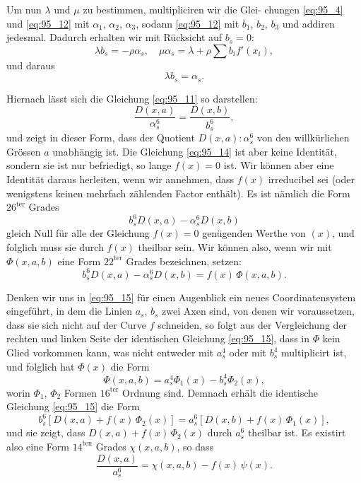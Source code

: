 \documentclass[12pt,a4paper]{article}
\theoremstyle{plain}
\theoremstyle{definition}
\theoremstyle{remark}
\begin{document}
Um nun $\lambda$ und $\mu$ zu bestimmen, multipliciren wir die Glei-
chungen \eqref{eq:95_4} und \eqref{eq:95_12} mit $\alpha_1$, $\alpha_2$, $\alpha_3$, sodann \eqref{eq:95_12} mit $b_1$, $b_2$, $b_3$
und addiren jedesmal. Dadurch erhalten wir mit Rücksicht
auf $b_s = 0$:
\begin{equation*}
\lambda b_s = -\rho \alpha_s, \quad \mu \alpha_s = \lambda + \rho \sum b_i f'(x_i),
\end{equation*}
und daraus
\begin{equation*}
\lambda b_s = \alpha_s.
\end{equation*}

Hiernach lässt sich die Gleichung \eqref{eq:95_11} so darstellen:
\begin{equation}\label{eq:95_14}
\frac{D(x, a)}{\alpha_s^6} = \frac{D(x, b)}{b_s^6},
\end{equation}
und zeigt in dieser Form, dass der Quotient $D(x, a) : \alpha_s^6$ von
den willkürlichen Grössen $a$ unabhängig ist. Die Gleichung \eqref{eq:95_14}
ist aber keine Identität, sondern sie ist nur befriedigt, so lange
$f(x) = 0$ ist. Wir können aber eine Identität daraus herleiten,
wenn wir annehmen, dass $f(x)$ irreducibel sei (oder wenigstens
keinen mehrfach zählenden Factor enthält). Es ist nämlich die
Form $26^{\text{ter}}$ Grades
\begin{equation*}
b_s^6 D(x, a) - \alpha_s^6 D(x, b)
\end{equation*}
gleich Null für alle der Gleichung $f(x) = 0$ genügenden Werthe
von $(x)$, und folglich muss sie durch $f(x)$ theilbar sein. Wir
können also, wenn wir mit $\Phi(x, a, b)$ eine Form $22^{\text{ter}}$ Grades
bezeichnen, setzen:
\begin{equation}\label{eq:95_15}
b_s^6 D(x, a) - \alpha_s^6 D(x, b) = f(x)\, \Phi(x, a, b).
\end{equation}

Denken wir uns in \eqref{eq:95_15} für einen Augenblick ein neues
Coordinatensystem eingeführt, in dem die Linien $a_s$, $b_s$ zwei Axen
sind, von denen wir voraussetzen, dass sie sich nicht auf der
Curve $f$ schneiden, so folgt aus der Vergleichung der rechten
und linken Seite der identischen Gleichung \eqref{eq:95_15}, dass in $\Phi$
kein Glied vorkommen kann, was nicht entweder mit $a_s^4$ oder
mit $b_s^4$ multiplicirt ist, und folglich hat $\Phi(x)$ die Form
\begin{equation*}
\Phi(x, a, b) = a_s^4 \Phi_1(x) - b_s^4 \Phi_2(x),
\end{equation*}
worin $\Phi_1$, $\Phi_2$ Formen $16^{\text{ter}}$ Ordnung sind. Demnach erhält die
identische Gleichung \eqref{eq:95_15} die Form
\begin{equation*}
b_s^6 [D(x, a) + f(x)\,\Phi_2(x)] = a_s^6 [D(x, b) + f(x)\,\Phi_1(x)],
\end{equation*}
und sie zeigt, dass $D(x, a) + f(x)\,\Phi_2(x)$ durch $a_s^6$ theilbar ist.
Es existirt also eine Form $14^{\text{ten}}$ Grades $\chi(x, a, b)$, so dass
\begin{equation}\label{eq:95_16}
\frac{D(x, a)}{a_s^6} = \chi(x, a, b) - f(x)\, \psi(x).
\end{equation}
\end{document}
